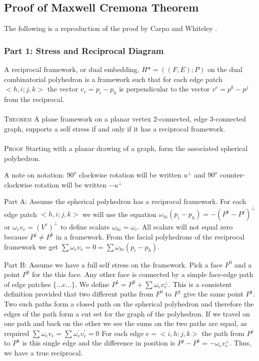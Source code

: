 \documentclass[11pt]{article}
\begin{document}
\subsection{Proof of Maxwell Cremona Theorem}
The following is a reproduction of the proof by Carpo and Whiteley \cite{mccProof}.
\subsubsection{Part 1: Stress and Reciprocal Diagram}
A reciprocal framework, or dual embedding, $H* = ((F,E);P)$ on the dual combinatorial polyhedron is a framework such that for each edge patch $<h,i;j,k>$  the vector $v_e = p_i - p_h$ is perpendicular to the vector $v^e = p^k - p^j$ from the reciprocal. \\
\\
\textsc{Theorem} A plane framework on a planar vertex 2-connected, edge 3-connected graph, supports a self stress if and only if it has a reciprocal framework. \\
\\
\textsc{Proof} Starting with a planar drawing of a graph, form the associated spherical polyhedron. 

A note on notation: $90^o$ clockwise rotation will be written $u^\bot$ and $90^o$ counter-clockwise rotation will be written $-u^\bot$

Part A: Assume the spherical polyhedron has a reciprocal framework.
For each edge patch $<h,i;j,k>$ we will use the equation $\omega_{hi}(p_i - p_h) = -(P^k - P^j)^\bot$ or $\omega_ev_e = (V^e)^\bot$ to define scalars $\omega_{hi} = \omega_e$. All scalars will not equal zero because $P^j \neq P^k$ in a framework. From the facial polyhedrons of the reciprocal framework we get $\sum\omega_ev_e = 0 = \sum\omega_{hi}(p_i - p_h)$.

Part B: Assume we have a full self stress on the framework.
Pick a face $F^0$ and a point $P^0$ for the this face. Any other face is connected by a simple face-edge path of edge patches $\{...e...\}$. We define $P^1 = P^0 + \sum\omega_ev_e^\bot$. This is a consistent definition provided that two different paths from $F^0$ to $F^1$ give the same point $P^1$. Two such paths form a closed path on the spherical polyhedron and therefore the edges of the path form a cut set for the graph of the polyhedron. If we travel on one path and back on the other we see the sums on the two paths are equal, as required $\sum\omega_ev_e = \sum\omega_e^{'}v_e^{'} = 0$ For each edge $e = <i,h;j,k>$ the path from $P^j$ to $P^k$ is this single edge and the difference in position is $P^j - P^k = -\omega_ev_e^\bot$. Thus, we have a true reciprocal.
\end{document}
